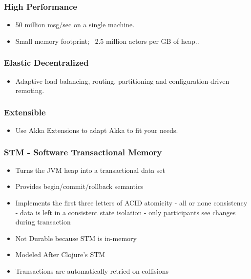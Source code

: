 \documentclass{beamer}
\begin{document}
\frame
    {
      \frametitle{High Performance}

      \begin{itemize}
        \item 50 million msg/sec on a single machine. 
        \item Small memory footprint; ~2.5 million actors per GB of heap.. 
      \end{itemize}
    }


\frame
    {
      \frametitle{Elastic Decentralized}

      \begin{itemize}
        \item  Adaptive load balancing, routing, partitioning and configuration-driven remoting.
      \end{itemize}
    }


\frame
    {
      \frametitle{Extensible}

      \begin{itemize}
        \item Use Akka Extensions to adapt Akka to fit your needs.
      \end{itemize}
    }




    \frame
        {
          \frametitle{STM - Software Transactional Memory}
          \begin{itemize}
          \item Turns the JVM heap into a transactional data set
          \item Provides begin/commit/rollback semantics
          \item Implements the first three letters of ACID
            atomicity - all or none
            consistency - data is left in a consistent state
            isolation - only participants see changes during transaction
          \item Not Durable because STM is in-memory
          \item Modeled After Clojure's STM
          \item Transactions are automatically retried on collisions
          \end{itemize}
        }
\end{document}

